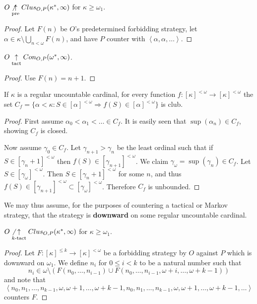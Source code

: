 \begin{proposition}
$O\not\underset{\text{pre}}{\uparrow} Clus_{O,P}(\kappa^*,\infty)$ for $\kappa\geq\omega_1$.
\end{proposition}

\begin{proof}
Let $F(n)$ be $O$'s predetermined forbidding strategy, let $\alpha\in\kappa\setminus\bigcup_{n<\omega}F(n)$, and have $P$ counter with $\left<\alpha,\alpha,\dots\right>$.
\end{proof}


\begin{proposition}
$O\underset{\text{tact}}{\uparrow}Con_{O,P}(\omega^*,\infty)$.
\end{proposition}

\begin{proof}
Use $F(n)=n+1$.
\end{proof}

\begin{theorem}
If $\kappa$ is a regular uncountable cardinal, for every function $f:[\kappa]^{<\omega}\to[\kappa]^{<\omega}$ the set $C_f = \{\alpha < \kappa : S\in[\alpha]^{<\omega} \Rightarrow f(S)\in[\alpha]^{<\omega}\}$ is club.
\end{theorem}

\begin{proof}
First assume $\alpha_0<\alpha_1<\dots\in C_f$. It is easily seen that $\sup(\alpha_n)\in C_f$, showing $C_f$ is closed.

Now assume $\gamma_0\in C_f$. Let $\gamma_{n+1}>\gamma_n$ be the least ordinal such that if $S\in[\gamma_n+1]^{<\omega}$ then $f(S)\in[\gamma_{n+1}]^{<\omega}$. We claim $\gamma_\omega = \sup(\gamma_n)\in C_f$. Let $S\in[\gamma_\omega]^{<\omega}$. Then $S\in[\gamma_n+1]^{<\omega}$ for some $n$, and thus $f(S)\in[\gamma_{n+1}]^{<\omega}\subset[\gamma_\omega]^{<\omega}$. Therefore $C_f$ is unbounded.
\end{proof}

We may thus assume, for the purposes of countering a tactical or Markov strategy, that the strategy is \textbf{downward} on some regular uncountable cardinal.

\begin{theorem}
$O\not\underset{k\text{-tact}}{\uparrow}Clus_{O,P}(\kappa^*,\infty)$ for $\kappa\geq\omega_1$.
\end{theorem}

\begin{proof}
Let $F:[\kappa]^{\leq k} \to [\kappa]^{<\omega}$ be a forbidding strategy by $O$ against $P$ which is downward on $\omega_1$. We define $n_i$ for $0\leq i < k$ to be a natural number such that \[ n_i \in \omega \setminus(F(n_0,\dots,n_{i-1}) \cup F(n_0,\dots,n_{i-1},\omega+i,\dots,\omega+k-1))\] and note that\[\left<n_0,n_1,\dots,n_{k-1},\omega,\omega+1,\dots,\omega+k-1,n_0,n_1,\dots,n_{k-1},\omega,\omega+1,\dots,\omega+k-1,\dots\right>\] counters $F$.
\end{proof}

